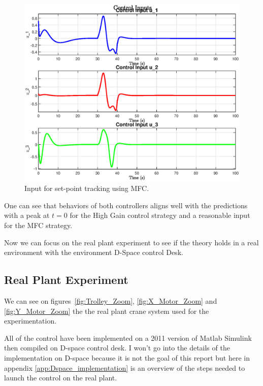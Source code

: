 \begin{figure}[htbp]
    \centering
    \includegraphics[width=0.8\linewidth]{imgs/section1/u_efficientMFC_Good_CI.eps}
    \caption{Input for set-point tracking using MFC.}
    \label{fig:Input_MFC}
\end{figure}

One can see that behaviors of both controllers aligns well with the predictions with a peak at \(t = 0\) for 
the High Gain control strategy and a reasonable input for the MFC strategy.

Now we can focus on the real plant experiment to see if the theory holds in a real environment with the environment
D-Space control Desk.

\newpage
\subsection{Real Plant Experiment}

We can see on figures~\ref{fig:Trolley_Zoom}, \ref{fig:X_Motor_Zoom} 
and \ref{fig:Y_Motor_Zoom} the the real plant crane system used for the
experimentation.

All of the control have been implemented on a 2011 version of Matlab Simulink
then compiled on D-space control desk. I won't go into the details of the
implementation on D-space because it is not the goal of this report but here 
in appendix \ref{app:Dspace_implementation} is an overview of the steps needed
to launch the control on the real plant.


